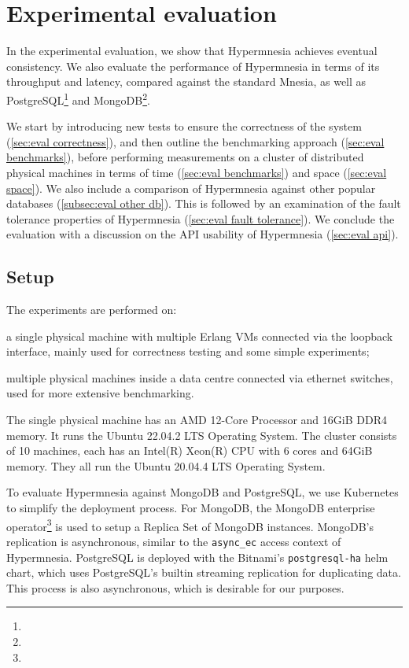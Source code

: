 \section{Experimental evaluation} \label{sec:eval}

In the experimental evaluation, we show that Hypermnesia achieves eventual consistency.
We also evaluate the performance of Hypermnesia in terms of its throughput and latency,
compared against the standard Mnesia, as well as PostgreSQL\footnote{} and MongoDB\footnote{}.

We start by introducing new tests to ensure
the correctness of the system (\cref{sec:eval correctness}), and then outline
the benchmarking approach (\cref{sec:eval benchmarks}), before performing 
measurements on a cluster of distributed physical machines in terms of
time (\cref{sec:eval benchmarks}) and space (\cref{sec:eval space}).
We also include a comparison of Hypermnesia against other popular 
databases (\cref{subsec:eval other db}).
This is followed by an examination of the fault tolerance properties of Hypermnesia
(\cref{sec:eval fault tolerance}).
We conclude the evaluation with a discussion on the API usability of 
Hypermnesia (\cref{sec:eval api}).

\subsection{Setup}

The experiments are performed on:
\begin{enumerate*}[(a)]
  \item a single physical machine with multiple Erlang VMs connected via the loopback 
  interface, mainly used for correctness testing and some simple experiments;
  \item multiple physical machines inside a data centre connected via ethernet
  switches, used for more extensive benchmarking.
\end{enumerate*}

The single physical machine has an AMD 12-Core Processor and 16GiB DDR4 memory. 
It runs the Ubuntu 22.04.2 LTS Operating System. The cluster consists
of 10 machines, each has an Intel(R) Xeon(R) CPU with 6 cores and 64GiB memory.
They all run the Ubuntu 20.04.4 LTS Operating System.


To evaluate Hypermnesia against MongoDB and PostgreSQL, we use Kubernetes to simplify
the deployment process. For MongoDB, the MongoDB enterprise operator\footnote{} is used
to setup a Replica Set of MongoDB instances. MongoDB's replication is asynchronous,
similar to the \verb|async_ec| access context of Hypermnesia. PostgreSQL is deployed 
with the Bitnami's \texttt{postgresql-ha} helm chart, which uses PostgreSQL's builtin
streaming replication for duplicating data. This process is also asynchronous, which
is desirable for our purposes.


